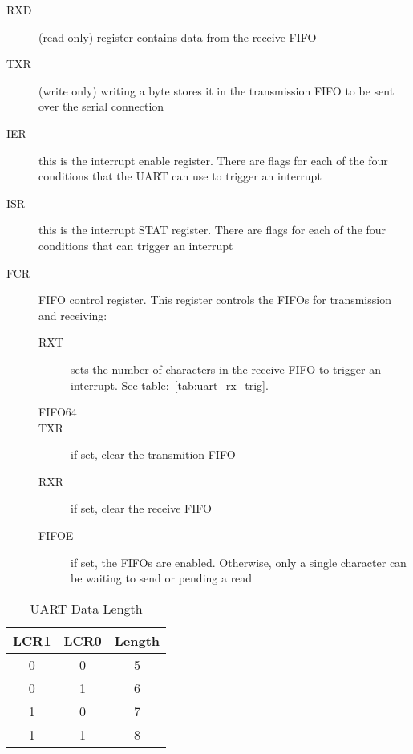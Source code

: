 \begin{description}
    \item[RXD] (read only) register contains data from the receive FIFO

    \item[TXR] (write only) writing a byte stores it in the transmission FIFO to be sent over the serial connection

    \item[IER] this is the interrupt enable register. There are flags for each of the four conditions that the UART can use to trigger an interrupt

    \item[ISR] this is the interrupt STAT register. There are flags for each of the four conditions that can trigger an interrupt

    \item[FCR] FIFO control register. This register controls the FIFOs for transmission and receiving:
        \begin{description}
            \item[RXT] sets the number of characters in the receive FIFO to trigger an interrupt. See table:~\ref{tab:uart_rx_trig}.

            \item[FIFO64]

            \item[TXR] if set, clear the transmition FIFO

            \item[RXR] if set, clear the receive FIFO

            \item[FIFOE] if set, the FIFOs are enabled. Otherwise, only a single character can be waiting to send or pending a read
        \end{description}
\end{description}

\begin{table}[ht]
    \begin{center}
        \begin{tabular}{|c|c|c|} \hline
            LCR1 & LCR0 & Length \\ \hline\hline
            0 & 0 & 5 \\ \hline
            0 & 1 & 6 \\ \hline
            1 & 0 & 7 \\ \hline
            1 & 1 & 8 \\ \hline
        \end{tabular}
    \end{center}
    \caption{UART Data Length}
    \label{tab:uart_data}
\end{table}

